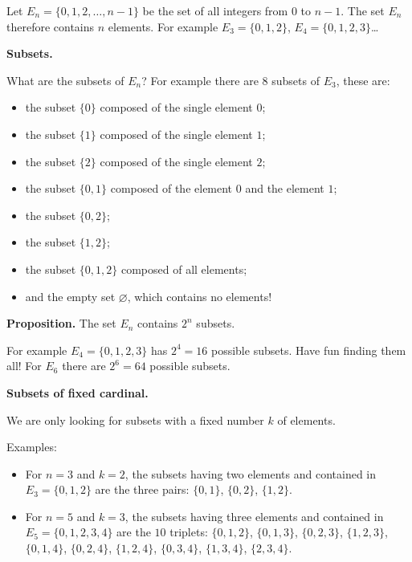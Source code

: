 \documentclass[11pt,class=report,crop=false]{standalone}
\begin{document}
\begin{cours}[Subsets]

Let $E_n = \{0,1,2,\ldots,n-1\}$ be the set of all integers from $0$ to $n-1$. The set $E_n$ therefore contains $n$ elements.
For example $E_3 = \{ 0,1,2 \}$, $E_4 = \{ 0,1,2,3 \}$\ldots

\bigskip

\textbf{Subsets.}

What are the subsets of $E_n$? For example there are $8$ subsets of $E_3$, these are:
    \begin{itemize}
      \item the subset $\{0\}$ composed of the single element $0$;
      \item the subset $\{1\}$ composed of the single element $1$;      
      \item the subset $\{2\}$ composed of the single element $2$; 
      \item the subset $\{0,1\}$ composed of the element $0$ and the element $1$;           
      \item the subset $\{0,2\}$;
      \item the subset $\{1,2\}$; 
      \item the subset $\{0, 1,2\}$ composed of all elements;
      \item and the empty set $\varnothing$, which contains no elements!    
    \end{itemize} 

\medskip

\textbf{Proposition.} The set $E_n$ contains $2^n$ subsets.

\medskip

For example $E_4 = \{ 0,1,2,3 \}$ has $2^4 = 16$ possible subsets. Have fun finding them all! For $E_6$ there are $2^6 = 64$ possible subsets.

\bigskip

\textbf{Subsets of fixed cardinal.}

We are only looking for subsets with a fixed number $k$ of elements.

Examples:
\begin{itemize}
  \item For $n = 3$ and $k = 2$, the subsets having two elements and contained in $E_3 = \{ 0,1,2 \}$ are the three pairs: $\{0,1\}$, $\{0,2\}$, $\{1,2\}$.

  \item For $n = 5$ and $k = 3$, the subsets having three elements and contained in $E_5 = \{ 0,1,2,3,4 \}$ are the $10$ triplets:
  $\{0, 1, 2\}$, $\{0, 1, 3\}$, $\{0, 2, 3\}$, $\{1, 2, 3\}$, $\{0, 1, 4\}$, $\{0, 2, 4\}$, $\{1, 2, 4\}$, $\{0, 3, 4\}$, $\{1, 3, 4\}$, $\{2, 3, 4\}$.
  
\end{itemize}

\end{cours}
\end{document}
